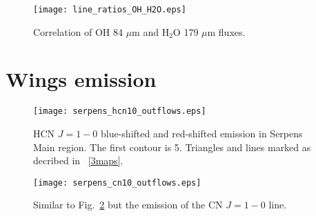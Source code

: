 \documentclass{aa}
\begin{document}
\begin{appendix}
\begin{figure}
\texttt{[image: line\_ratios\_OH\_H2O.eps]}
\caption{Correlation of OH 84 $\mu$m and H$_2$O 179 $\mu$m fluxes.}
\label{h13cn10}
\end{figure}

\section{Wings emission}

\begin{figure}
\texttt{[image: serpens\_hcn10\_outflows.eps]}
\caption{HCN $J=1-0$ blue-shifted and red-shifted emission in Serpens Main region. The first contour is 5. Triangles and lines marked as decribed in ~\ref{3maps}.}
\label{hcn10_blue_red}
\end{figure}

\begin{figure}
\texttt{[image: serpens\_cn10\_outflows.eps]}
\caption{Similar to Fig.~\ref{hcn10_blue_red} but the emission of the CN $J=1-0$ line.}
\label{cn10_blue_red}
\end{figure}


\end{appendix}
\end{document}
